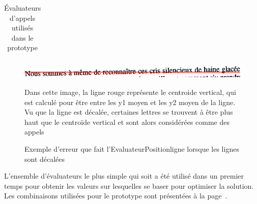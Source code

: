 \begin{table}
\begin{tabular}{| p{4cm} | p{12cm} |}
    \hline
\end{tabular}
\begin{figure}
\centerline{\includegraphics[width=500px, height=25px]{figures/exemple-ligne-decalee.png}}
\caption{Exemple d'erreur que fait l'EvaluateurPositionligne lorsque les lignes sont décalées}{Dans cette image, la ligne rouge représente le centroide vertical, qui est calculé pour être entre les y1 moyen et les y2 moyen de la ligne. Vu que la ligne est décalée, certaines lettres se trouvent à être plus haut que le centroïde vertical et sont alors considérées comme des appels}
\label{erreur-evaluateurpositionligne}
\end{figure}
\label{tableau-evaluateurs}
\caption{Évaluateurs d'appels utilisés dans le prototype}
\end{table}
L'ensemble d'évaluateurs le plus simple qui soit a été utilisé dans un premier temps pour obtenir les valeurs sur lesquelles se baser pour optimiser la solution. Les combinaisons utilisées pour le prototype sont présentées à la page~\pageref{combinaisons-evaluateurs}.
